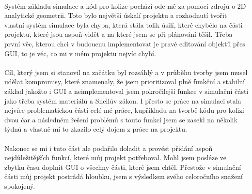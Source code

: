 \documentclass[12pt,a4paper]{report}
\begin{document}
\paragraph{} Systém základu simulace a kód pro kolize pochází ode mě za pomoci zdrojů o 2D analytické geometrii. Toto bylo největší úskalí projektu a rozhodnutí tvořit vlastní systém simulace byla chyba, která stála tolik úsilí, které chybělo na části projektu, které jsou aspoň vidět a na které jsem se při plánování těšil. Třeba první věc, kterou chci v budoucnu implementovat je pravé editování objektů přes GUI, to je věc, co mi v mém projektu nejvíc chybí.
\paragraph{} Cíl, který jsem si stanovil na začátku byl rozsáhlý a v průběhu tvorby jsem musel udělat kompromisy, které znamenaly, že jsem prioritizoval plně funkční a stabilní základ jakožto i GUI a neimplementoval jsem pokročilejší funkce v simulační části jako třeba systém materiálů a Snellův zákon. I přesto se práce na simulaci stala nejvíce problematickou částí celé mé práce, kupříkladu na tvorbě kódu pro kolizi dvou čar a následném řešení problémů s touto funkcí jsem se zasekl na několik týdnů a vlastně mi to zkazilo celý dojem z práce na projektu.
\paragraph{} Nakonec se mi i tuto část ale podařilo doladit a provést přidání aspoň nejdůležitějších funkcí, které můj projekt potřeboval. Mohl jsem posléze ve zbytku času doplnit GUI o všechny části, které jsem chtěl. Přestože v simulační části můj projekt postrádá hloubku, jsem s výsledkem svého celoročního snažení spokojený.
\end{document}
